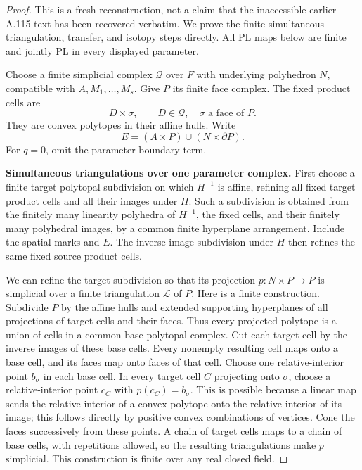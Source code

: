 \begin{proof}
This is a fresh reconstruction, not a claim that the inaccessible earlier A.115 text has been recovered verbatim. We prove the finite simultaneous-triangulation, transfer, and isotopy steps directly. All PL maps below are finite and jointly PL in every displayed parameter.

Choose a finite simplicial complex \(\mathcal Q\) over \(F\) with underlying polyhedron \(N\), compatible with \(A,M_1,\ldots,M_s\). Give \(P\) its finite face complex. The fixed product cells are
\[
 D\times\sigma,\qquad D\in\mathcal Q,\quad
 \sigma\text{ a face of }P.
 \tag{115R.1}
\]
They are convex polytopes in their affine hulls. Write
\[
 E=(A\times P)\cup(N\times\partial P).
 \tag{115R.2}
\]
For \(q=0\), omit the parameter-boundary term.

\textbf{Simultaneous triangulations over one parameter complex.}
First choose a finite target polytopal subdivision on which \(H^{-1}\) is affine, refining all fixed target product cells and all their images under \(H\). Such a subdivision is obtained from the finitely many linearity polyhedra of \(H^{-1}\), the fixed cells, and their finitely many polyhedral images, by a common finite hyperplane arrangement. Include the spatial marks and \(E\). The inverse-image subdivision under \(H\) then refines the same fixed source product cells.

We can refine the target subdivision so that its projection \(p:N\times P\to P\) is simplicial over a finite triangulation \(\mathcal L\) of \(P\). Here is a finite construction. Subdivide \(P\) by the affine hulls and extended supporting hyperplanes of all projections of target cells and their faces. Thus every projected polytope is a union of cells in a common base polytopal complex. Cut each target cell by the inverse images of these base cells. Every nonempty resulting cell maps onto a base cell, and its faces map onto faces of that cell. Choose one relative-interior point \(b_\sigma\) in each base cell. In every target cell \(C\) projecting onto \(\sigma\), choose a relative-interior point \(c_C\) with \(p(c_C)=b_\sigma\). This is possible because a linear map sends the relative interior of a convex polytope onto the relative interior of its image; this follows directly by positive convex combinations of vertices. Cone the faces successively from these points. A chain of target cells maps to a chain of base cells, with repetitions allowed, so the resulting triangulations make \(p\) simplicial. This construction is finite over any real closed field.


\end{proof}
